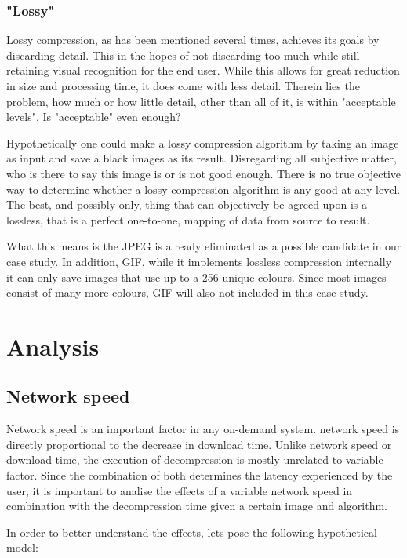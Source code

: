 \documentclass[11pt,a4paper]{report}
\begin{document}
\subsubsection{"Lossy"}

Lossy compression, as has been mentioned several times, achieves its goals by discarding detail. This in the hopes of not discarding too much while still retaining visual recognition for the end user. While this allows for great reduction in size and processing time, it does come with less detail. Therein lies the problem, how much or how little detail, other than all of it, is within "acceptable levels". Is "acceptable" even enough?

Hypothetically one could make a lossy compression algorithm by taking an image as input and save a black images as its result. Disregarding all subjective matter, who is there to say this image is or is not good enough. There is no true objective way to determine whether a lossy compression algorithm is any good at any level. The best, and possibly only, thing that can objectively be agreed upon is a lossless, that is a perfect one-to-one, mapping of data from source to result.

What this means is the JPEG is already eliminated as a possible candidate in our case study. In addition, GIF, while it implements  lossless compression internally it can only save images that use up to a 256 unique colours. Since most images consist of many more colours, GIF will also not included in this case study.

\section{\label{analysis}Analysis}

\subsection{\label{effectnetwork}Network speed}

Network speed is an important factor in any on-demand system. network speed is directly proportional to the decrease in download time. Unlike network speed or download time, the execution of decompression is mostly unrelated to variable factor. Since the combination of both determines the latency experienced by the user, it is important to analise the effects of a variable network speed in combination with the decompression time given a certain image and algorithm.

In order to better understand the effects, lets pose the following hypothetical model:
\end{document}
